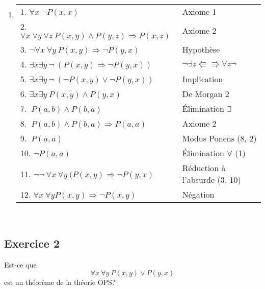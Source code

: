 \begin{enumerate}
    \item \hspace{1pt}
    \begin{center}
    \begin{tabular}{|l|l|}
    \hline
    1. $\forall x \ \neg P(x, x)$ & Axiome 1 \\
    2. $\forall x \ \forall y \ \forall z \ P(x, y) \wedge P(y, z) \Rightarrow P(x, z)$ & Axiome 2 \\
    \hspace{0.5cm} 3. $\neg \forall x \ \forall y \  P(x, y) \Rightarrow \neg P(y,x)$ & Hypothèse \\
    \hspace{0.5cm} 4. $ \exists x \exists y \ \neg \ \left( P(x, y) \Rightarrow \neg P(y,x) \right) $ & $\neg \exists z \Lleftarrow \Rrightarrow \forall z \neg$ \\
    \hspace{0.5cm} 5. $ \exists x \exists y \ \neg \ \left(\neg P(x, y) \lor \neg P(y,x) \right) $ & Implication \\
    \hspace{0.5cm} 6. $ \exists x \exists y \ P(x, y) \land P(y,x) $ & De Morgan 2 \\
    \hspace{0.5cm} 7. $ \ P(a, b) \land P(b,a) $ & Élimination $\exists$ \\
    \hspace{0.5cm} 8. $ \ P(a, b) \land P(b,a) \Rightarrow P(a,a) $ & Axiome 2 \\
    \hspace{0.5cm} 9. $ \ P(a,a) $ & Modus Ponens (8, 2) \\
    \hspace{0.5cm} 10. $ \neg P(a, a) $ & Élimination $\forall$ (1) \\
    11. $ \neg\neg \ \forall x \ \forall y \ (P(x, y) \Rightarrow \neg P(y,x) $ & Réduction à l'absurde (3, 10) \\
    12. $ \forall x \ \forall y P(x,y) \Rightarrow \neg P(x,y) $ & Négation \\


\hline
\end{tabular}\\
\end{center}
\end{enumerate}
\subsection*{Exercice 2}
Est-ce que
$$
\forall x \ \forall y \ P(x, y) \vee P(y, x)
$$
est un th\'{e}or\`{e}me de la th\'{e}orie OPS?

